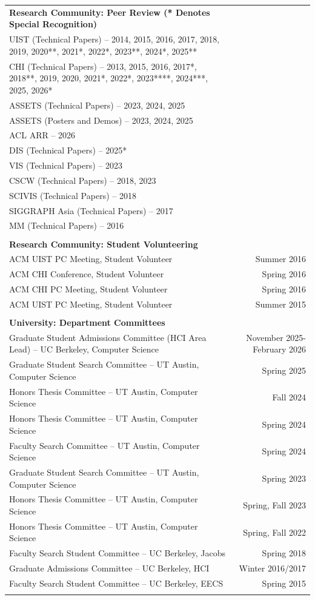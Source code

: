 \begin{longtable}{Xr}
	\textbf{Research Community: Peer Review (* Denotes Special Recognition)} &  \\
	UIST (Technical Papers) -- 2014, 2015, 2016, 2017, 2018, 2019, 2020**, 2021*, 2022*, 2023**, 2024*, 2025** &  \\
	CHI (Technical Papers) -- 2013, 2015, 2016, 2017*, 2018**, 2019, 2020, 2021*, 2022*, 2023****, 2024***, 2025, 2026* &  \\
	ASSETS (Technical Papers) -- 2023, 2024, 2025 &  \\
	ASSETS (Posters and Demos) -- 2023, 2024, 2025 &  \\
	ACL ARR -- 2026 &  \\
	DIS (Technical Papers) -- 2025* &  \\
	VIS (Technical Papers) -- 2023 &  \\
	CSCW (Technical Papers) -- 2018, 2023 &  \\
	SCIVIS (Technical Papers) -- 2018 &  \\
	SIGGRAPH Asia (Technical Papers) -- 2017 &  \\
	MM (Technical Papers) -- 2016 &  \\
	\\

	\textbf{Research Community: Student Volunteering} &  \\
	ACM UIST PC Meeting, Student Volunteer & Summer 2016 \\
	ACM CHI Conference, Student Volunteer & Spring 2016 \\
	ACM CHI PC Meeting, Student Volunteer & Spring 2016 \\
	ACM UIST PC Meeting, Student Volunteer & Summer 2015 \\
	\\

	\textbf{University: Department Committees} &  \\
	Graduate Student Admissions Committee (HCI Area Lead) -- UC Berkeley, Computer Science & November 2025-February 2026 \\
	Graduate Student Search Committee -- UT Austin, Computer Science & Spring 2025 \\
	Honors Thesis Committee -- UT Austin, Computer Science & Fall 2024 \\
	Honors Thesis Committee -- UT Austin, Computer Science & Spring 2024 \\
	Faculty Search Committee -- UT Austin, Computer Science & Spring 2024 \\
	Graduate Student Search Committee -- UT Austin, Computer Science & Spring 2023 \\
	Honors Thesis Committee -- UT Austin, Computer Science & Spring, Fall 2023 \\
	Honors Thesis Committee -- UT Austin, Computer Science & Spring, Fall 2022 \\
	Faculty Search Student Committee -- UC Berkeley, Jacobs & Spring 2018 \\
	Graduate Admissions Committee -- UC Berkeley, HCI & Winter 2016/2017 \\
	Faculty Search Student Committee -- UC Berkeley, EECS & Spring 2015 \\
	\\


\end{longtable}
